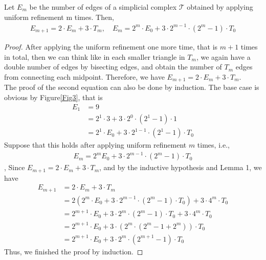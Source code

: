     \begin{lemma}
    Let $E_{m}$ be the number of edges of a simplicial complex $\mathcal{T}$ obtained by applying uniform refinement m times. Then,
    \begin{align*}
    E_{m+1} = 2 \cdot E_m + 3 \cdot T_m, \quad E_{m} = 2^{m}\cdot E_0 + 3 \cdot2^{m-1}\cdot(2^{m} -1)\cdot T_0
    \end{align*}
    \end{lemma}
    \begin{proof}
    After applying the uniform refinement one more time, that is $m+1$ times in total, then we can think like in each smaller triangle in $T_m$, we again have a double number of edges by bisecting edges, and obtain the number of $T_m$ edges from connecting each midpoint. Therefore, we have $E_{m+1} = 2\cdot E_m + 3\cdot T_m$.\\
    The proof of the second equation can also be done by induction. The base case is obvious by Figure\ref{Fig3}, that is
    \begin{align*}
    E_1 &= 9 \\
    &= 2^1\cdot 3 + 3\cdot 2^0 \cdot (2^1 - 1)\cdot1\\
    &= 2^1\cdot E_0 + 3\cdot2^{1-1}\cdot(2^1 - 1)\cdot T_0
    \end{align*}
    Suppose that this holds after applying uniform refinement $m$ times, i.e., 
    \begin{align*}
    E_{m} = 2^{m} E_0 + 3 \cdot2^{m-1}\cdot(2^{m} -1)\cdot T_0 
    \end{align*}, 
    Since $E_{m+1} = 2 \cdot E_m + 3 \cdot T_m$, and by the inductive hypothesis and Lemma 1, we have
    \begin{align*}
    E_{m+1} &= 2 \cdot E_m + 3 \cdot T_m \\
    &= 2(2^{m}\cdot E_0 + 3 \cdot2^{m-1}\cdot(2^{m} -1)\cdot T_0) + 3\cdot 4^m\cdot T_0\\
    &= 2^{m+1}\cdot E_0 + 3\cdot2^m\cdot(2^m - 1)\cdot T_0 + 3\cdot4^m\cdot T_0\\
    &= 2^{m+1}\cdot E_0 + 3\cdot(2^m\cdot(2^m -1 + 2^m))\cdot T_0\\
    &=2^{m+1}\cdot E_0 + 3\cdot2^m\cdot(2^{m+1}-1)\cdot T_0
    \end{align*}
    Thus, we finished the proof by induction.
    \end{proof}

